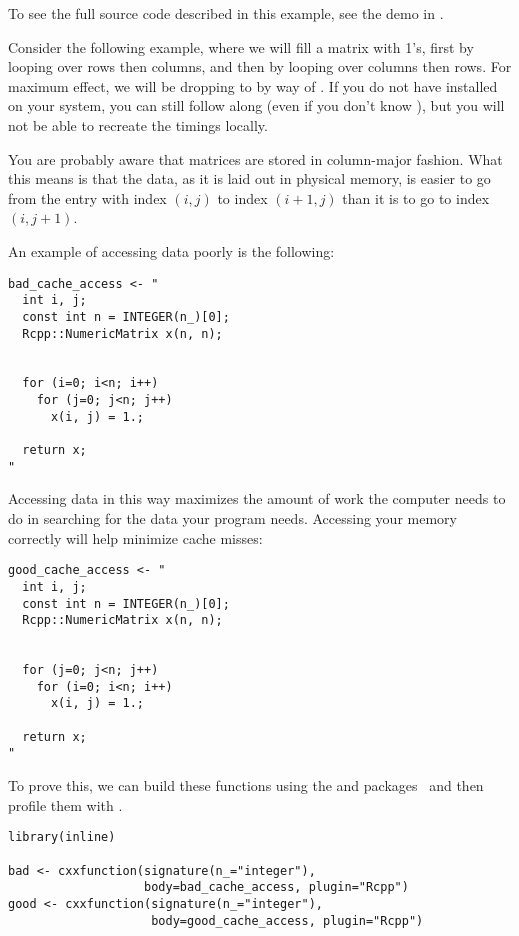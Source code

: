 To see the full source code described in this example, see the  demo in 
\thispackage.

Consider the following example, where we will fill a matrix with 1's, first by 
looping over rows then columns, and then by looping over columns then rows.  For 
maximum effect, we will be dropping to \C by way of .  If you do not 
have  installed on your system, you can still follow along (even if 
you don't know \CXX), but you will not be able to recreate the timings locally.

You are probably aware that \R matrices are stored in column-major fashion.  
What this means is that the data, as it is laid out in physical memory, is 
easier to go from the entry with index $(i, j)$ to index $(i+1, j)$ than 
it is to go to index $(i, j+1)$.  

An example of accessing data poorly is the following:
\begin{lstlisting}[language=rr]
bad_cache_access <- "
  int i, j;
  const int n = INTEGER(n_)[0];
  Rcpp::NumericMatrix x(n, n);
  
  
  for (i=0; i<n; i++)
    for (j=0; j<n; j++)
      x(i, j) = 1.;
  
  return x;
"
\end{lstlisting}

Accessing data in this way maximizes the 
amount of work the computer needs to do in searching for the data your program 
needs.  Accessing your memory correctly will help minimize cache misses: 

\begin{lstlisting}[language=rr]
good_cache_access <- "
  int i, j;
  const int n = INTEGER(n_)[0];
  Rcpp::NumericMatrix x(n, n);
  
  
  for (j=0; j<n; j++)
    for (i=0; i<n; i++)
      x(i, j) = 1.;
  
  return x;
"
\end{lstlisting}

To prove this, we can build these functions using the  and 
 packages~\citep{inline,rcpp} and then profile them with \thispackage.

\begin{lstlisting}[language=rr]
library(inline)

bad <- cxxfunction(signature(n_="integer"), 
                   body=bad_cache_access, plugin="Rcpp")
good <- cxxfunction(signature(n_="integer"), 
                    body=good_cache_access, plugin="Rcpp")
\end{lstlisting}


